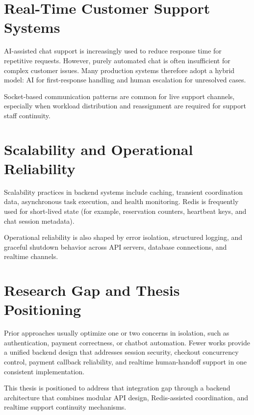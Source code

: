 \section{Real-Time Customer Support Systems}

AI-assisted chat support is increasingly used to reduce response time for repetitive requests. However, purely automated chat is often insufficient for complex customer issues. Many production systems therefore adopt a hybrid model: AI for first-response handling and human escalation for unresolved cases.

Socket-based communication patterns are common for live support channels, especially when workload distribution and reassignment are required for support staff continuity.

\section{Scalability and Operational Reliability}

Scalability practices in backend systems include caching, transient coordination data, asynchronous task execution, and health monitoring. Redis is frequently used for short-lived state (for example, reservation counters, heartbeat keys, and chat session metadata).

Operational reliability is also shaped by error isolation, structured logging, and graceful shutdown behavior across API servers, database connections, and realtime channels.

\section{Research Gap and Thesis Positioning}

Prior approaches usually optimize one or two concerns in isolation, such as authentication, payment correctness, or chatbot automation. Fewer works provide a unified backend design that addresses session security, checkout concurrency control, payment callback reliability, and realtime human-handoff support in one consistent implementation.

This thesis is positioned to address that integration gap through a backend architecture that combines modular API design, Redis-assisted coordination, and realtime support continuity mechanisms.
